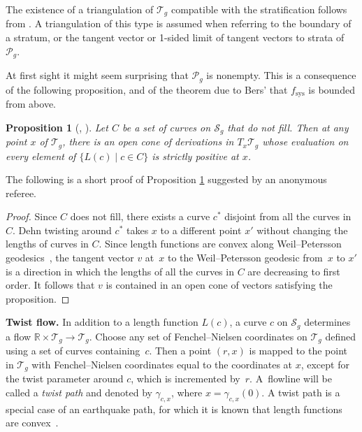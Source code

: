\documentclass[11pt]{article}
\numberwithin{equation}{section}
\numberwithin{equation}{section}
\newtheorem{Proposition}[Theorem]{Proposition}
\begin{document}
The existence of a triangulation of $\mathcal{T}_{g}$ compatible with the stratification follows from \cite{Lojasiewicz1964}. A triangulation of this type is assumed when referring to the boundary of a stratum, or the tangent vector or 1-sided limit of tangent vectors to strata of $\mathcal{P}_{g}$.

At first sight it might seem surprising that $\mathcal{P}_{g}$ is nonempty. This is a consequence of the following proposition, and of the theorem due to Bers' \cite{Bers1985} that $f_{\mathrm{sys}}$ is bounded from above.

\begin{Proposition}[{\cite[Proposition 0.1]{Thurston}, \cite[Lemma 4]{Bers}}]
\label{Thurstonprop}
Let $C$ be a set of curves on $\mathcal{S}_{g}$ that do not fill. Then at any point $x$ of $\mathcal{T}_{g}$, there is an open cone of derivations in $T_{x}\mathcal{T}_{g}$ whose evaluation on every element of $\{L(c) \mid c\in C\}$ is strictly positive at $x$.
\end{Proposition}

The following is a short proof of Proposition \ref{Thurstonprop} suggested by an anonymous referee.

\begin{proof}
Since $C$ does not fill, there exists a curve $c^{*}$ disjoint from all the curves in $C$. Dehn twisting around $c^{*}$ takes $x$ to a different point $x'$ without changing the lengths of curves in $C$. Since length functions are convex along Weil--Petersson geodesics~\cite{Wolpert}, the tangent vector $v$ at~$x$ to the Weil--Petersson geodesic from~$x$ to $x'$ is a direction in which the lengths of all the curves in $C$ are decreasing to first order. It follows that $v$ is contained in an open cone of vectors satisfying the proposition.
\end{proof}

\textbf{Twist flow.} In addition to a length function $L(c)$, a curve $c$ on $\mathcal{S}_{g}$ determines a flow $\mathbb{R}\times \mathcal{T}_{g}\rightarrow \mathcal{T}_{g}$. Choose any set of Fenchel--Nielsen coordinates on $\mathcal{T}_{g}$ defined using a set of curves containing~$c$. Then a point $(r,x)$ is mapped to the point in $\mathcal{T}_{g}$ with Fenchel--Nielsen coordinates equal to the coordinates at $x$, except for the twist parameter around $c$, which is incremented by~$r$. A~flowline will be called a \textit{twist path} and denoted by $\gamma_{c, x}$, where $x=\gamma_{c,x}(0)$. A twist path is a special case of an earthquake path, for which it is known that length functions are convex~\cite{Kerckhoff}.
\end{document}
